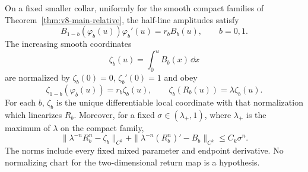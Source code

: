 \begin{theorem}
\label{thm:v14-intrinsic-density}
On a fixed smaller collar, uniformly for the smooth compact families
of Theorem~\ref{thm:v8-main-relative}, the half-line amplitudes satisfy
\begin{equation}\label{eq:v14-one-flight-cocycle}
 B_{1-b}(\varphi_b(u))\varphi_b'(u)=r_bB_b(u),
                              \qquad b=0,1.
\end{equation}
The increasing smooth coordinates
\begin{equation}\label{eq:v14-linearizing-coordinate}
 \zeta_b(u)=\int_0^u B_b(x)\,\dd x
\end{equation}
are normalized by $\zeta_b(0)=0$, $\zeta_b'(0)=1$ and obey
\begin{equation}\label{eq:v14-linearization}
 \zeta_{1-b}(\varphi_b(u))=r_b\zeta_b(u),\qquad
 \zeta_b(R_b(u))=\lambda\zeta_b(u).
\end{equation}
For each $b$, $\zeta_b$ is the unique differentiable local coordinate
with that normalization which linearizes $R_b$. Moreover, for a fixed
$\sigma\in(\lambda_+,1)$, where $\lambda_+$ is the maximum of
$\lambda$ on the compact family,
\begin{equation}\label{eq:v14-iterate-limits}
 \|\lambda^{-n}R_b^n-\zeta_b\|_{C^k}
 +\|\lambda^{-n}(R_b^n)'-B_b\|_{C^k}
                                  \le C_k\sigma^n.
\end{equation}
The norms include every fixed mixed parameter and endpoint derivative.
No normalizing chart for the two-dimensional return map is a hypothesis.
\end{theorem}

